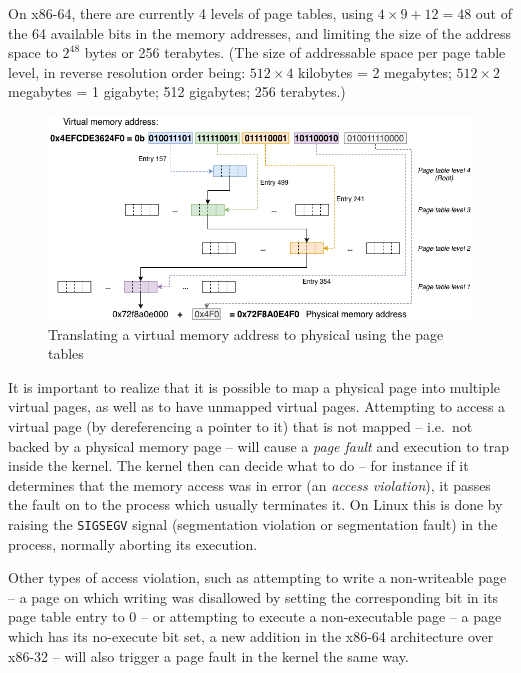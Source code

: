 On x86-64, there are currently 4 levels of page tables, using $4 \times 9 + 12 = 48$ out of the 64 available bits in the memory addresses, and limiting the size of the address space to $2^{48}$ bytes or 256 terabytes. (The size of addressable space per page table level, in reverse resolution order being: $512 \times 4$ kilobytes = 2 megabytes; $512 \times 2$ megabytes = 1 gigabyte; 512 gigabytes; 256 terabytes.)

\begin{figure}
	\centering
	\includegraphics[width=\textwidth]{diagrams/page_table_tree.png}
	\caption{Translating a virtual memory address to physical using the page tables}
	\label{fig:page_table_tree}
\end{figure}

It is important to realize that it is possible to map a physical page into multiple virtual pages, as well as to have unmapped virtual pages. Attempting to access a virtual page (by dereferencing a pointer to it) that is not mapped -- i.e.\ not backed by a physical memory page -- will cause a \emph{page fault} and execution to trap inside the kernel. The kernel then can decide what to do -- for instance if it determines that the memory access was in error (an \emph{access violation}), it passes the fault on to the process which usually terminates it. On Linux this is done by raising the \texttt{SIGSEGV} signal (segmentation violation or segmentation fault) in the process, normally aborting its execution.

Other types of access violation, such as attempting to write a non-writeable page -- a page on which writing was disallowed by setting the corresponding bit in its page table entry to 0 -- or attempting to execute a non-executable page -- a page which has its no-execute bit set, a new addition in the x86-64 architecture over x86-32 -- will also trigger a page fault in the kernel the same way.

